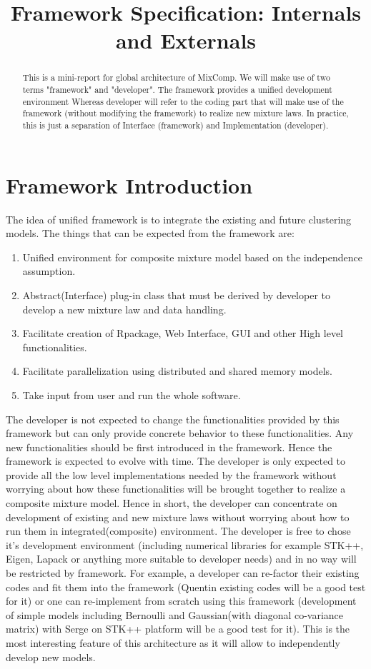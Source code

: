 \documentclass[a4paper,11pt]{article}
\title{Framework Specification: Internals and Externals}
\begin{document}
\maketitle
\tableofcontents

\begin{abstract}
This is a mini-report for global architecture of MixComp. We will make use of two terms
"framework" and "developer". The framework provides a unified development
environment Whereas developer will refer to the coding part that will make use of
the framework (without modifying the framework) to realize new mixture laws. In
practice, this is just a separation of Interface (framework) and Implementation (developer).
\end{abstract}
\section{Framework Introduction}
The idea of unified framework is to integrate the existing and future clustering models.
The things that can be expected from the framework are:
\begin{enumerate}
\item Unified environment for composite mixture model based on the independence assumption.
\item Abstract(Interface) plug-in class that must be derived by developer to develop a
new mixture law and data handling.
\item Facilitate creation of Rpackage, Web Interface, GUI and other High level functionalities.
\item Facilitate parallelization using distributed and shared memory models.
\item Take input from user and run the whole software.
\end{enumerate}

The developer is not expected to change the functionalities provided by this framework
but can only provide concrete behavior to these functionalities. Any new functionalities
should be first introduced in the framework. Hence the framework is expected to evolve
with time. The developer is only expected to provide all the low level implementations
needed by the framework without worrying about how these functionalities will be
brought together to realize a composite mixture model. Hence in short, the developer
can concentrate on development of existing and new mixture laws without worrying
about how to run them in integrated(composite) environment. The developer is free
to chose it's development environment (including numerical libraries for example
STK++, Eigen, Lapack or anything more suitable to developer needs) and in no way
will be restricted by framework. For example, a developer can re-factor their
existing codes and fit them into the framework (Quentin existing codes will be
a good test for it) or one can re-implement from scratch  using this framework
(development of simple models including Bernoulli and Gaussian(with diagonal
co-variance matrix) with Serge on STK++ platform will be a good test for it).
This is the most interesting feature of this architecture as it will allow to
independently develop new models.
\end{document}
